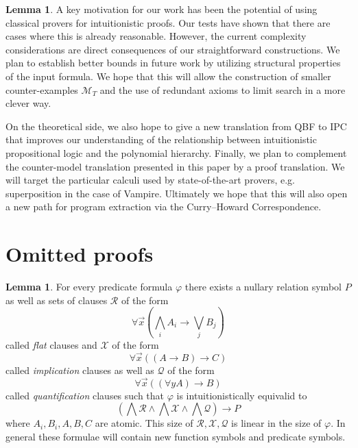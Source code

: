 \documentclass{easychair}
\theoremstyle{definition}
\theoremstyle{definition}
\theoremstyle{definition}
\newtheorem{lemma}[theorem]{Lemma}
\theoremstyle{definition}
\theoremstyle{definition}
\theoremstyle{definition}
\theoremstyle{definition}
\begin{document}
\begin{lemma}
A key motivation for our work has been the potential of using classical provers for intuitionistic proofs. Our tests have shown that there are cases where this is already reasonable.
However, the current complexity considerations are direct consequences of our straightforward constructions. We plan to establish better bounds in future work by utilizing structural properties of the input formula. We hope that this will allow the construction of smaller counter-examples $\mathcal M_T$ and the use of redundant axioms to limit search in a more clever way.

On the theoretical side, we also hope to give a new translation from QBF to IPC that improves our understanding of the relationship between intuitionistic propositional logic and the polynomial hierarchy.
Finally, we plan to complement the counter-model translation presented in this paper by a proof translation.
We will target the particular calculi used by state-of-the-art provers, e.g. superposition in the case of Vampire. Ultimately we hope that this will also open a new path for program extraction via the Curry--Howard Correspondence.




\appendix

\section{Omitted proofs}

\begin{lemma}\label{proof:first-order-normal-form}
	For every predicate formula $\varphi$ there exists a nullary relation symbol $P$ as well as sets of clauses $\mathcal R$ of the form
	$$\forall \vec x\left(\bigwedge_i A_i\to \bigvee_j B_j\right)$$
	called \emph{flat} clauses and $\mathcal X$ of the form
	$$\forall \vec x\left((A\to B)\to C\right)$$
	called \emph{implication} clauses as well as $\mathcal Q$ of the form
	$$\forall\vec x\left((\forall y A)\to B\right)$$
	called \emph{quantification} clauses such that $\varphi$ is intuitionistically equivalid to
	$$\left(\bigwedge\mathcal R\wedge\bigwedge \mathcal X\wedge\bigwedge\mathcal Q\right)\to P$$where $A_i, B_i, A, B, C$ are atomic. This size of $\mathcal R, \mathcal X, \mathcal Q$ is linear in the size of $\varphi$. In general these formulae will contain new function symbols and predicate symbols.
\end{lemma}


\end{lemma}
\end{document}
